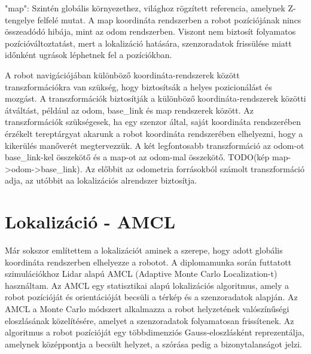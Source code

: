 "map": Szintén globális környezethez, világhoz rögzített referencia, amelynek Z-tengelye felfelé mutat. A map koordináta rendszerben a robot pozíciójának nincs összeadódó hibája, mint az odom rendszerben. Viszont nem biztosít folyamatos pozícióváltoztatást, mert a lokalizáció hatására, szenzoradatok frissülése miatt időnként ugrások léphetnek fel a pozíciókban.

A robot navigációjában különböző koordináta-rendszerek között transzformációkra van szükség, hogy biztosítsák a helyes pozicionálást és mozgást. A transzformációk biztosítják a különböző koordináta-rendszerek közötti átváltást, például az odom, base\_link és map rendszerek között. Az transzformációk szükségesek, ha egy szenzor által, saját koordináta rendszerében érzékelt tereptárgyat akarunk a robot koordináta rendszerében elhelyezni, hogy a kikerülés manőverét megtervezzük. A két legfontosabb transzformáció az odom-ot base\_link-kel összekötő és a map-ot az odom-mal összekötő.
TODO(kép map->odom->base\_link). Az előbbit az odometria forrásokból számolt transzformáció adja, az utóbbit aa lokalizációs alrendszer biztosítja. \cite{ros_wiki} \cite{ros2_design}

\section{Lokalizáció - AMCL}
Már sokszor említettem a lokalizációt aminek a szerepe, hogy adott globális koordináta rendszerben elhelyezze a robotot. A diplomamunka során futtatott szimulációkhoz Lidar alapú AMCL (Adaptive Monte Carlo Localization-t) használtam. Az AMCL egy statisztikai alapú lokalizációs algoritmus, amely a robot pozícióját és orientációját becsüli a térkép és a szenzoradatok alapján. Az AMCL a Monte Carlo módszert alkalmazza a robot helyzetének valószínűségi eloszlásának közelítésére, amelyet a szenzoradatok folyamatosan frissítenek. Az algoritmus a robot pozícióját egy többdimenziós Gauss-eloszlásként reprezentálja, amelynek középpontja a becsült helyzet, a szórása pedig a bizonytalanságot jelzi. \cite{nav2}